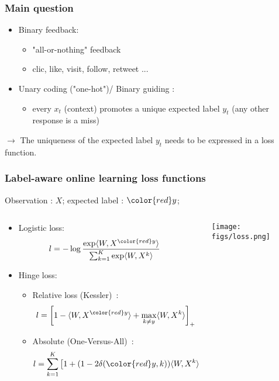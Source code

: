 \documentclass{beamer}
\begin{document}
\begin{frame}\frametitle{Main question}
		\begin{itemize}
			\item Binary feedback:
			\begin{itemize}
				\item "all-or-nothing" feedback
				\item clic, like, visit, follow, retweet ...
			\end{itemize}
			\item Unary coding ("one-hot")/ Binary guiding : 
			\begin{itemize}
				\item every $x_t$ (context) promotes a unique expected label $y_t$
				(any other response is a miss)
			\end{itemize}
		\end{itemize}
		$\rightarrow$ The uniqueness of the expected label $y_t$ needs to be expressed in a loss function.
\end{frame}



\begin{frame}\frametitle{Label-aware online learning loss functions}
	Observation : $X$; expected label : ${\color{red}y}$; 
	\small
	\begin{columns}
		\begin{column}{.8\linewidth}
			\begin{footnotesize}
			\begin{itemize}
				\item Logistic loss:
				\begin{align*} 
				l &= - \log \frac{\exp \langle W, X^{\color{red}y} \rangle}{ \sum_{k=1}^K \exp\langle W, X^k\rangle}
				\end{align*}
				\item Hinge loss: 
				\begin{itemize}
					\item Relative loss (Kessler)~:
					$$l =  \left[ 1 -  \langle W, X^{\color{red}y} \rangle + \max_{k \neq y} \langle W, X^k\rangle\right]_+$$
					\item Absolute (One-Versus-All)~:
					$$l = \sum_{k=1}^K \left[1 + (1 - 2 \delta({\color{red}y},k)) \langle W, X^k\rangle\right]_+$$
				\end{itemize}
			\end{itemize}
			\end{footnotesize}			
		\end{column}
		\begin{column}{.2\linewidth}
			\centerline{\texttt{[image: figs/loss.png]}}
		\end{column}	
	\end{columns}
	\normalsize
	
\end{frame}
\end{document}

